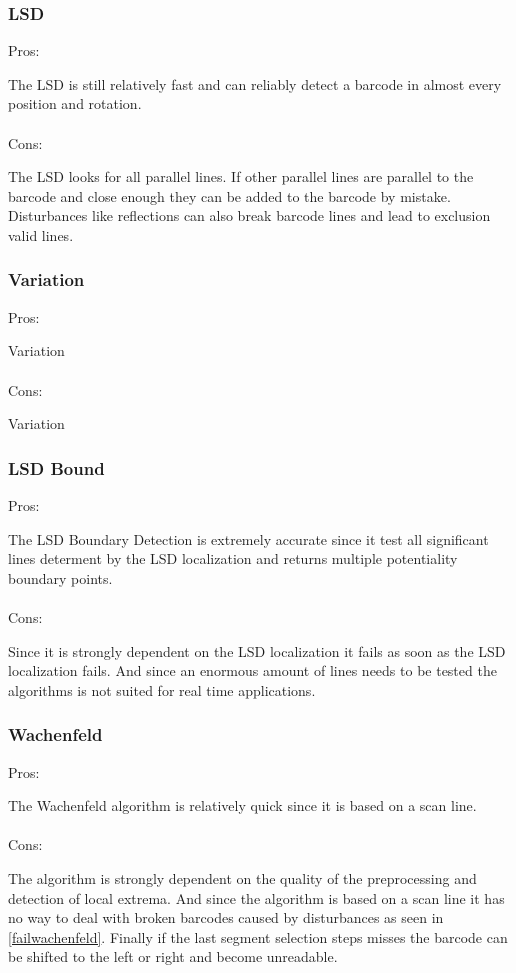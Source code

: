\subsubsection*{LSD}
Pros:

The LSD is still relatively fast and can reliably detect a barcode in almost every position and rotation.
\\
\\
Cons:

The LSD looks for all parallel lines. If other parallel lines are parallel to the barcode and close enough they can be added to the barcode by mistake. Disturbances like reflections can also break barcode lines and lead to exclusion valid lines.

\subsubsection*{Variation}
Pros:

Variation
\\
\\
Cons:

Variation

\subsubsection*{LSD Bound}
Pros:

The LSD Boundary Detection is extremely accurate since it test all significant lines determent by the LSD localization and returns multiple potentiality boundary points.
\\
\\
Cons:

Since it is strongly dependent on the LSD localization it fails as soon as the LSD localization fails. And since an enormous amount of lines needs to be tested the algorithms is not suited for real time applications.

\subsubsection*{Wachenfeld}
Pros:

The Wachenfeld algorithm is relatively quick since it is based on a scan line.
\\
\\
Cons:

The algorithm is strongly dependent on the quality of the preprocessing and detection of local extrema. And since the algorithm is based on a scan line it has no way to deal with broken barcodes caused by disturbances as seen in \cref{failwachenfeld}. Finally if the last segment selection steps misses the barcode can be shifted to the left or right and become unreadable.

